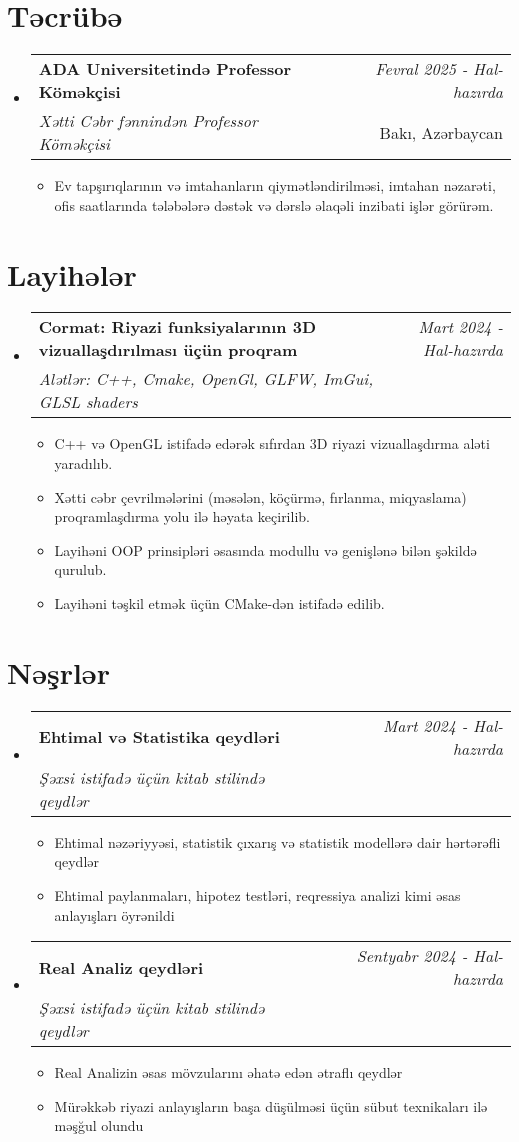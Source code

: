 \documentclass[a4paper,11pt]{article}
\makeatletter
\newcommand{\resumeSubheading}[4]{
    \vspace{0.5mm}
\item
    \begin{tabular*}{0.98\textwidth}[t]{l@{\extracolsep{\fill}}r}
        \textbf{#1} & \textit{\footnotesize{#4}} \\
        \textit{\footnotesize{#3}} &  \footnotesize{#2}\\
    \end{tabular*}
    \vspace{-2.4mm}
}
\newcommand{\resumeProject}[4]{
    \vspace{0.5mm}
\item
    \begin{tabular*}{0.98\textwidth}[t]{l@{\extracolsep{\fill}}r}
        \textbf{#1} & \textit{\footnotesize{#3}} \\
        \footnotesize{\textit{#2}} & \footnotesize{#4}
    \end{tabular*}
    \vspace{-2.4mm}
}
\newcommand{\resumeSubHeadingListStart}{
\begin{itemize}[leftmargin=*,labelsep=1mm]}
\newcommand{\resumeItemListStart}{
                \begin{itemize}[leftmargin=*,labelsep=1mm,itemsep=0.5mm]}
\newcommand{\resumeSubHeadingListEnd}{
                    \end{itemize}\vspace{2mm}}
\newcommand{\resumeItemListEnd}{
    \end{itemize}\vspace{-2mm}}
\makeatother
\begin{document}
\section{\textbf{Təcrübə}}
\resumeSubHeadingListStart
\resumeSubheading
{ADA Universitetində Professor Köməkçisi}{Bakı, Azərbaycan}
{Xətti Cəbr fənnindən Professor Köməkçisi}{Fevral 2025 - Hal-hazırda}
\resumeItemListStart
\item Ev tapşırıqlarının və imtahanların qiymətləndirilməsi, imtahan nəzarəti, ofis saatlarında tələbələrə dəstək və dərslə əlaqəli
inzibati işlər görürəm.
\resumeItemListEnd
\resumeSubHeadingListEnd

\section{\textbf{Layihələr}}
\resumeSubHeadingListStart
\resumeProject
{Cormat: Riyazi funksiyalarının 3D vizuallaşdırılması üçün proqram}
{Alətlər: C++, Cmake, OpenGl, GLFW, ImGui, GLSL shaders}
{Mart 2024 - Hal-hazırda}
{{}\href{https://github.com/JosephMehdiyev/cormat}{\textcolor{darkblue}{\faGithub}}}
\resumeItemListStart
\item C++ və OpenGL istifadə edərək sıfırdan 3D riyazi vizuallaşdırma aləti yaradılıb.
\item Xətti cəbr çevrilmələrini (məsələn, köçürmə, fırlanma, miqyaslama) proqramlaşdırma yolu ilə həyata keçirilib.
\item Layihəni OOP prinsipləri əsasında modullu və genişlənə bilən şəkildə qurulub.
\item Layihəni təşkil etmək üçün CMake-dən istifadə edilib.
\resumeItemListEnd
\resumeSubHeadingListEnd

\section{\textbf{Nəşrlər}}
\resumeSubHeadingListStart
\resumeProject
{Ehtimal və Statistika qeydləri}
{Şəxsi istifadə üçün kitab stilində qeydlər}
{Mart 2024 - Hal-hazırda}
{{}\href{https://github.com/JosephMehdiyev/Statistics-and-Probability-with-Code-Applications/blob/main/main.pdf}{\textcolor{darkblue}{\faGithub}}}
\resumeItemListStart
\item Ehtimal nəzəriyyəsi, statistik çıxarış və statistik modellərə dair hərtərəfli qeydlər
\item Ehtimal paylanmaları, hipotez testləri, reqressiya analizi kimi əsas anlayışları öyrənildi
\resumeItemListEnd

\resumeProject
{Real Analiz qeydləri}
{Şəxsi istifadə üçün kitab stilində qeydlər}
{Sentyabr 2024 - Hal-hazırda}
{{}\href{https://github.com/JosephMehdiyev/MathmeticalAnalysisNotes/blob/main/main.pdf}{\textcolor{darkblue}{\faGithub}}}
\resumeItemListStart
\item Real Analizin əsas mövzularını əhatə edən ətraflı qeydlər
\item Mürəkkəb riyazi anlayışların başa düşülməsi üçün sübut texnikaları ilə məşğul olundu
\resumeItemListEnd
\resumeSubHeadingListEnd
\end{document}
